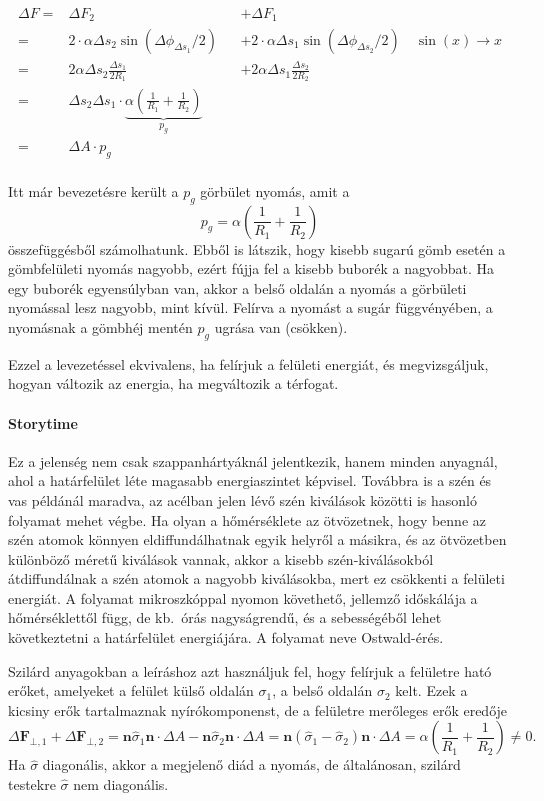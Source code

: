 \documentclass[12pt,a4paper]{scrartcl}
\let\mathbf\bm
\begin{document}
\[\begin{aligned}
  \Delta F =  & \Delta {F_2} &  &  + \Delta {F_1} \\ 
   =  & 2 \cdot \alpha \Delta {s_2}\sin \left( {\Delta {\phi _{\Delta {s_1}}}/2} \right) &  &  + 2 \cdot \alpha \Delta {s_1}\sin \left( {\Delta {\phi _{\Delta {s_2}}}/2} \right)\quad \sin \left( x \right) \to x \\ 
   =  & 2\alpha \Delta {s_2}\frac{{\Delta {s_1}}}{{2{R_1}}} &  &  + 2\alpha \Delta {s_1}\frac{{\Delta {s_2}}}{{2{R_2}}} \\ 
   =  & \Delta {s_2}\Delta {s_1} \cdot \underbrace {\alpha \left( {\frac{1}{{{R_1}}} + \frac{1}{{{R_2}}}} \right)}_{{p_g}} \\ 
   =  & \Delta A \cdot {p_g} \\ 
\end{aligned} \]

Itt már bevezetésre került a $p_g$ görbület nyomás, amit a 
\[{p_g} = \alpha \left( {\frac{1}{{{R_1}}} + \frac{1}{{{R_2}}}} \right)\]
összefüggésből számolhatunk. Ebből is látszik, hogy kisebb sugarú gömb esetén a gömbfelületi nyomás nagyobb, ezért fújja fel a kisebb buborék a nagyobbat. Ha egy buborék egyensúlyban van, akkor a belső oldalán a nyomás a görbületi nyomással lesz nagyobb, mint kívül. Felírva a nyomást a sugár függvényében, a nyomásnak a gömbhéj mentén $p_g$ ugrása van (csökken).

Ezzel a levezetéssel ekvivalens, ha felírjuk a felületi energiát, és megvizsgáljuk, hogyan változik az energia, ha megváltozik a térfogat.
\footnotesize
\paragraph{Storytime}
Ez a jelenség nem csak szappanhártyáknál jelentkezik, hanem minden anyagnál, ahol a határfelület léte magasabb energiaszintet képvisel. Továbbra is a szén és vas példánál maradva, az acélban jelen lévő szén kiválások közötti is hasonló folyamat mehet végbe. Ha olyan a hőmérséklete az ötvözetnek, hogy benne az szén atomok könnyen eldiffundálhatnak egyik helyről a másikra, és az ötvözetben különböző méretű kiválások vannak, akkor a kisebb szén-kiválásokból átdiffundálnak a szén atomok a nagyobb kiválásokba, mert ez csökkenti a felületi energiát. A folyamat mikroszkóppal nyomon követhető, jellemző időskálája a hőmérséklettől függ, de kb.\ órás nagyságrendű, és a sebességéből lehet következtetni a határfelület energiájára. A folyamat neve Ostwald-érés.

Szilárd anyagokban a leíráshoz azt használjuk fel, hogy felírjuk a felületre ható erőket, amelyeket a felület külső oldalán $\sigma_1$, a belső oldalán $\sigma_2$ kelt. Ezek a kicsiny erők tartalmaznak nyírókomponenst, de a felületre merőleges erők eredője
\[\Delta {{\mathbf{F}}_{ \bot ,1}} + \Delta {{\mathbf{F}}_{ \bot ,2}} = {\mathbf{n}}{\hat \sigma _1}{\mathbf{n}} \cdot \Delta A - {\mathbf{n}}{\hat \sigma _2}{\mathbf{n}} \cdot \Delta A = {\mathbf{n}}\left( {{{\hat \sigma }_1} - {{\hat \sigma }_2}} \right){\mathbf{n}} \cdot \Delta A = \alpha \left( {\frac{1}{{{R_1}}} + \frac{1}{{{R_2}}}} \right) \ne 0.\]
Ha $\hat \sigma$ diagonális, akkor a megjelenő diád a nyomás, de általánosan, szilárd testekre $\hat \sigma$ nem diagonális.
\normalsize
\end{document}
